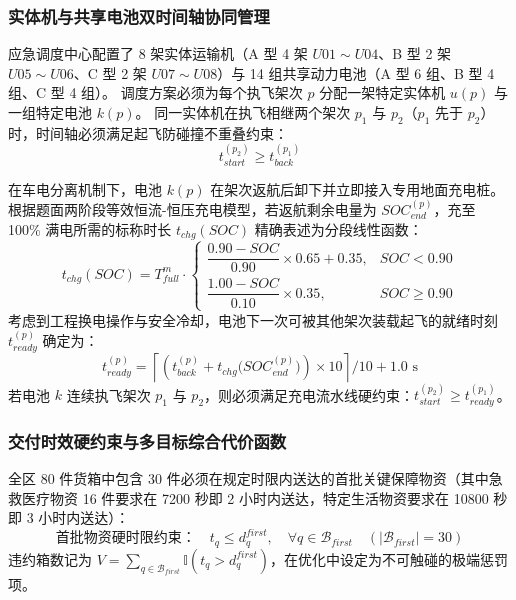 \subsubsection{实体机与共享电池双时间轴协同管理}
应急调度中心配置了 8 架实体运输机（A 型 4 架 $U01 \sim U04$、B 型 2 架 $U05 \sim U06$、C 型 2 架 $U07 \sim U08$）与 14 组共享动力电池（A 型 6 组、B 型 4 组、C 型 4 组）。
调度方案必须为每个执飞架次 $p$ 分配一架特定实体机 $u(p)$ 与一组特定电池 $k(p)$。
同一实体机在执飞相继两个架次 $p_1$ 与 $p_2$（$p_1$ 先于 $p_2$）时，时间轴必须满足起飞防碰撞不重叠约束：
\begin{equation}
    t_{start}^{(p_2)} \ge t_{back}^{(p_1)}
    \label{eq:drone_overlap}
\end{equation}

在车电分离机制下，电池 $k(p)$ 在架次返航后卸下并立即接入专用地面充电桩。
根据题面两阶段等效恒流-恒压充电模型，若返航剩余电量为 $SOC_{end}^{(p)}$，充至 100\% 满电所需的标称时长 $t_{chg}(SOC)$ 精确表述为分段线性函数：
\begin{equation}
    t_{chg}(SOC) = T_{full}^m \cdot \begin{cases}
        \dfrac{0.90 - SOC}{0.90} \times 0.65 + 0.35, & SOC < 0.90 \\[0.8em]
        \dfrac{1.00 - SOC}{0.10} \times 0.35, & SOC \ge 0.90
    \end{cases}
    \label{eq:two_stage_charge}
\end{equation}
考虑到工程换电操作与安全冷却，电池下一次可被其他架次装载起飞的就绪时刻 $t_{ready}^{(p)}$ 确定为：
\begin{equation}
    t_{ready}^{(p)} = \left\lceil \left( t_{back}^{(p)} + t_{chg}\big(SOC_{end}^{(p)}\big) \right) \times 10 \right\rceil / 10 + 1.0\text{ s}
    \label{eq:batt_ready}
\end{equation}
若电池 $k$ 连续执飞架次 $p_1$ 与 $p_2$，则必须满足充电流水线硬约束：$t_{start}^{(p_2)} \ge t_{ready}^{(p_1)}$。

\subsubsection{交付时效硬约束与多目标综合代价函数}
全区 80 件货箱中包含 30 件必须在规定时限内送达的首批关键保障物资（其中急救医疗物资 16 件要求在 7200 秒即 2 小时内送达，特定生活物资要求在 10800 秒即 3 小时内送达）：
\begin{equation}
    \text{首批物资硬时限约束：} \quad t_q \le d_q^{first}, \quad \forall q \in \mathcal{B}_{first} \quad (|\mathcal{B}_{first}| = 30)
    \label{eq:hard_deadline}
\end{equation}
违约箱数记为 $V = \sum_{q \in \mathcal{B}_{first}} \mathbb{I}(t_q > d_q^{first})$，在优化中设定为不可触碰的极端惩罚项。

